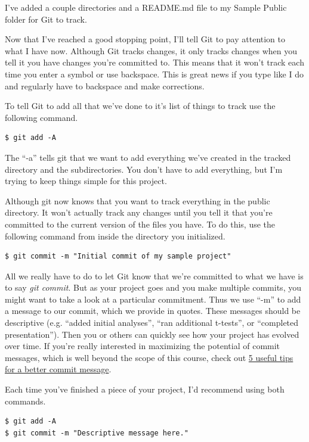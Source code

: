 \documentclass[12pt]{article}
\begin{document}
I've added a couple directories and a README.md file to my Sample Public folder for Git to track.

Now that I've reached a good stopping point, I'll tell Git to pay attention to what I have now.
Although Git tracks changes, it only tracks changes when you tell it you have changes you're committed
to. This means that it won't track each time you enter a symbol or use backspace. This is great news
if you type like I do and regularly have to backspace and make corrections.

To tell Git to add all that we've done to it's list of things to track use the following command.

\begin{verbatim}
$ git add -A
\end{verbatim}

The ``-a'' tells git that we want to add everything we've created in the tracked directory and
the subdirectories. You don't have to add everything, but I'm trying to keep things simple for this
project.

Although git now knows that you want to track everything in the public directory. It won't actually
track any changes until you tell it that you're committed to the current version of the files you have.
To do this, use the following command from inside the directory you initialized.

\begin{verbatim}
$ git commit -m "Initial commit of my sample project"
\end{verbatim}

All we really have to do to let Git know that we're committed to what we have is to say \emph{git commit}.
But as your project goes and you make multiple commits, you might want to take a look at a particular
commitment. Thus we use ``-m'' to add a message to our commit, which we provide in quotes. These
messages should be descriptive (e.g. ``added initial analyses'', ``ran additional t-tests'', or 
``completed presentation''). Then you or others can quickly see how your project has evolved over time.
If you're really interested in maximizing the potential of commit messages, which is well beyond the
scope of this course, check out
\href{https://robots.thoughtbot.com/5-useful-tips-for-a-better-commit-message}
{5 useful tips for a better commit message}.

Each time you've finished a piece of your project, I'd recommend using both commands.

\begin{verbatim}
$ git add -A
$ git commit -m "Descriptive message here."
\end{verbatim}
\end{document}
